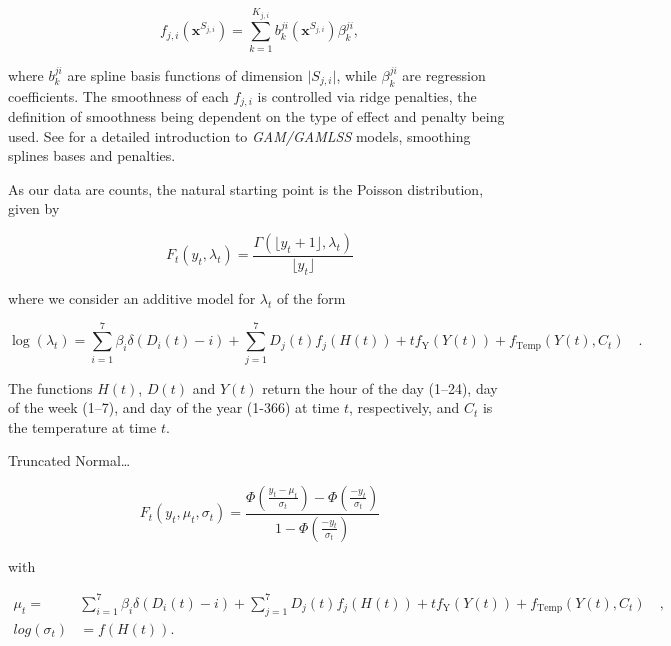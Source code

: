 \documentclass[]{elsarticle} %
\begin{document}
\begin{equation}
    f_{j,i}(\bm x^{S_{j,i}}) = \sum_{k=1}^{K_{j,i}} b^{ji}_k (\bm x^{S_{j,i}}) \beta_k^{ji},
    \label{eq:smmothfunction}
\end{equation}

where \(b^{ji}_k\) are spline basis functions of dimension \(\vert S_{j,i} \vert\), while \(\beta_k^{ji}\) are regression coefficients. The smoothness of each \(f_{j,i}\) is controlled via ridge penalties, the definition of smoothness being dependent on the type of effect and penalty being used. See \citet{Wood2017} for a detailed introduction to \emph{GAM/GAMLSS} models, smoothing splines bases and penalties.

As our data are counts, the natural starting point is the Poisson distribution, given by

\begin{equation}
  F_t(y_t,\lambda_t) =  \frac{\Gamma(\lfloor y_t + 1  \rfloor,\lambda_t)}{\lfloor y_t \rfloor}
  \label{eq:poissonreg}
\end{equation}

where we consider an additive model for \(\lambda_t\) of the form

\begin{equation}
  \log(\lambda_t) = \sum_{i=1}^7 \beta_i \delta(D_i(t)-i) + \sum_{j=1}^7 D_j(t) f_j(H(t)) + t f_\text{Y}(Y(t)) + f_\text{Temp}(Y(t),C_t) \quad .
 \label{eq:additivemodel}
\end{equation}

The functions \(H(t)\), \(D(t)\) and \(Y(t)\) return the hour of the day (1--24), day of the week (1--7), and day of the year (1-366) at time \(t\), respectively, and \(C_t\) is the temperature at time \(t\).

Truncated Normal\ldots{}

\begin{equation}
  F_t(y_t,\mu_t,\sigma_t) =  \frac{\Phi\left( \frac{y_t-\mu_t}{\sigma_t} \right) - \Phi\left( \frac{-y_t}{\sigma_t} \right)}{1 - \Phi\left( \frac{-y_t}{\sigma_t} \right)}
 \label{eq:truncatedn}
\end{equation}

with

\begin{align*}
  \mu_t = &  \sum_{i=1}^7 \beta_i \delta(D_i(t)-i) + \sum_{j=1}^7 D_j(t) f_j(H(t)) + t f_\text{Y}(Y(t)) + f_\text{Temp}(Y(t),C_t) \quad, \\
  log(\sigma_t) & = f(H(t)) .
\end{align*}
\end{document}
